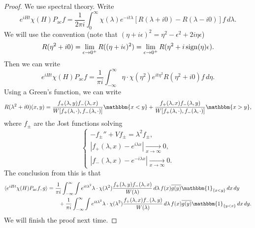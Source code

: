 \begin{proof}
  We use spectral theory. Write
  \[
    e^{iHt} \chi(H) P_{\mathrm{ac}} f
    = \frac{1}{2\pi i} \int_0^\infty \chi(\lambda) e^{-it\lambda} [R(\lambda + i0) - R(\lambda - i0)] f\, d\lambda.
  \]
  We will use the convention (note that
  $(\eta + i\epsilon)^2 = \eta^2 - \epsilon^2 + 2i\eta \epsilon$)
  \[
    R(\eta^2 + i 0) = \lim_{\epsilon \to 0^+} R((\eta + i\epsilon)^2)
    = \lim_{\epsilon \to 0^+} R(\eta^2 + i \operatorname{sign} (\eta) \epsilon).
  \]
  Then we can write
  \[
    e^{iHt} \chi(H) P_{\mathrm{ac}} f
    = \frac{1}{\pi i} \int_{-\infty}^\infty \eta \cdot \chi(\eta^2) e^{it\eta^2} R(\eta^2 + i0) f\, d\eta.
  \]
  Using a Green's function, we can write
  \[
    R(\lambda^2 + i 0)(x, y)
    = \frac{f_+(\lambda, y)f_-(\lambda, x)}{W[f_+(\lambda, \cdot), f_-(\lambda, \cdot)]} \mathbbm\{x < y\}
    + \frac{f_+(\lambda, x)f_-(\lambda, y)}{W[f_+(\lambda, \cdot), f_-(\lambda, \cdot)]} \mathbbm\{x > y\},
  \]
  where $f_{\pm}$ are the Jost functions solving
  \[
    \begin{cases}
      -f_{\pm}'' + V f_{\pm} = \lambda^2 f_{\pm}, \\
      |f_+(\lambda, x) - e^{i\lambda x}| \xrightarrow[x \to \infty]{} 0, \\
      |f_-(\lambda, x) - e^{-i\lambda x}| \xrightarrow[x \to \infty]{} 0.
    \end{cases}
  \]
  The conclusion from this is that
  \begin{align*}
    \langle e^{iHt} \chi(H) P_{\mathrm{ac}} f, g \rangle
    &=
    \frac{1}{\pi i} \int_{-\infty}^\infty
    \int e^{it \lambda^2} \lambda \cdot  \chi(\lambda^2)
    \frac{f_+(\lambda, y) f_-(\lambda, x)}{W(\lambda)}\, d\lambda\, f(x) \overline{g(y)} \mathbbm{1}_{\{x < y\}}\, dx\, dy \\
    & \quad \quad +
    \frac{1}{\pi i} \int_{-\infty}^\infty
    \int e^{it \lambda^2} \lambda \cdot  \chi(\lambda^2)
    \frac{f_+(\lambda, x) f_-(\lambda, y)}{W(\lambda)}\, d\lambda\, f(x) \overline{g(y)} \mathbbm{1}_{\{y < x\}}\, dx\, dy.
  \end{align*}
  We will finish the proof next time.
\end{proof}
